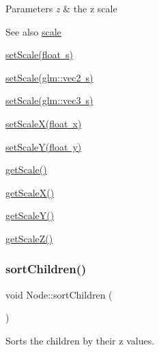 \begin{DoxyParams}{Parameters}
{\em z} & the z scale \\
\hline
\end{DoxyParams}
\begin{DoxySeeAlso}{See also}
\mbox{\hyperlink{classsage_1_1Node_a686c3edeea1faab8b566bfdf2fe3f906}{scale}} 

\mbox{\hyperlink{classsage_1_1Node_a939698b2eb68ee5b60b91e2426e95369}{set\+Scale(float s)}} 

\mbox{\hyperlink{classsage_1_1Node_aecff30b003ce1c2266cc60a34b72559d}{set\+Scale(glm\+::vec2 s)}} 

\mbox{\hyperlink{classsage_1_1Node_a7481b934a6ef259a14aee4d0b87cb2aa}{set\+Scale(glm\+::vec3 s)}} 

\mbox{\hyperlink{classsage_1_1Node_ab8126397f90ccdee0755b984b26809d8}{set\+Scale\+X(float x)}} 

\mbox{\hyperlink{classsage_1_1Node_afa22161545d63e9e011f8eeb5acdead7}{set\+Scale\+Y(float y)}} 

\mbox{\hyperlink{classsage_1_1Node_ac41e15cac1e23a4c48798291c70dcdd8}{get\+Scale()}} 

\mbox{\hyperlink{classsage_1_1Node_a27040ef8ab59ccf42b87d6ddc8d794e6}{get\+Scale\+X()}} 

\mbox{\hyperlink{classsage_1_1Node_ab87661ab8940512baf2e7639ea55ff87}{get\+Scale\+Y()}} 

\mbox{\hyperlink{classsage_1_1Node_a0b55ddbe04d126953e1db8606d9a9ecd}{get\+Scale\+Z()}} 
\end{DoxySeeAlso}
\mbox{\label{classsage_1_1Node_aa7d796f1bad7d0e23a4cdd2575b4b9f3}} 
\subsubsection{\texorpdfstring{sortChildren()}{sortChildren()}}
{\footnotesize\ttfamily void Node\+::sort\+Children (\begin{DoxyParamCaption}{ }\end{DoxyParamCaption})\hspace{0.3cm}{\ttfamily [protected]}}



Sorts the children by their z values. 

\mbox{\label{classsage_1_1Node_a32878481ba54b3856ab53c10af13848e}} 

